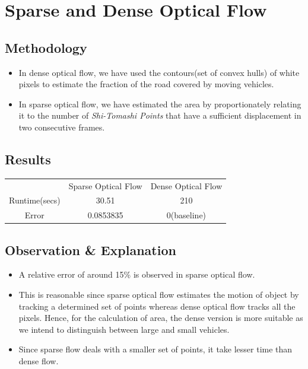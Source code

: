 \documentclass[a4paper]{article}
\begin{document}
\section*{Sparse and Dense Optical Flow}
\subsection*{Methodology}
\begin{itemize}
    \item In dense optical flow, we have used the contours(set of convex hulls) of white pixels to estimate the fraction of the road covered by moving vehicles.
    \item In sparse optical flow, we have estimated the area by proportionately relating it to the number of \textit{Shi-Tomashi Points} that have a sufficient displacement in two consecutive frames.
\end{itemize}
\subsection*{Results}
\begin{center}
\begin{tabular}{ c c c }
\setlength{\tabcolsep}{20pt}
  & Sparse Optical Flow & Dense Optical Flow\\ 
 Runtime(secs) &  30.51 &  210 \\  
 Error & 0.0853835 &  0(baseline)  \\
\end{tabular}
\end{center}
\subsection*{Observation \& Explanation}
\begin{itemize}
    \item A relative error of around 15\% is observed in sparse optical flow. 
    \item  This is reasonable since sparse optical flow estimates the motion of object by tracking a determined set of points whereas dense optical flow tracks all the pixels. Hence, for the calculation of area, the dense version is more suitable as we intend to distinguish between large and small vehicles.
    \item Since sparse flow deals with a smaller set of points, it take lesser time than dense flow.
\end{itemize}
\end{document}
